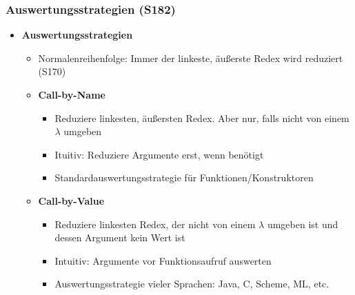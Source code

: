 \subsubsection{Auswertungsstrategien (S182)}
\begin{itemize}
	\item \textbf{Auswertungsstrategien}
	\begin{itemize}
		\item Normalenreihenfolge: Immer der linkeste, äußerste Redex wird reduziert (S170)
		\item \textbf{Call-by-Name}
		\begin{itemize}
			\item Reduziere linkesten, äußersten Redex. Aber nur, falls nicht von einem \(\lambda\) umgeben
			\item Ituitiv: Reduziere Argumente erst, wenn benötigt
			\item Standardauswertungsstrategie für Funktionen/Konstruktoren
		\end{itemize}
		\item \textbf{Call-by-Value}
		\begin{itemize}
			\item Reduziere linkesten Redex, der nicht von einem \(\lambda\) umgeben ist und dessen Argument kein Wert ist
			\item Intuitiv: Argumente vor Funktionsaufruf auswerten
			\item Auswertungsstrategie vieler Sprachen: Java, C, Scheme, ML, etc.
		\end{itemize}
	\end{itemize}
\end{itemize}


